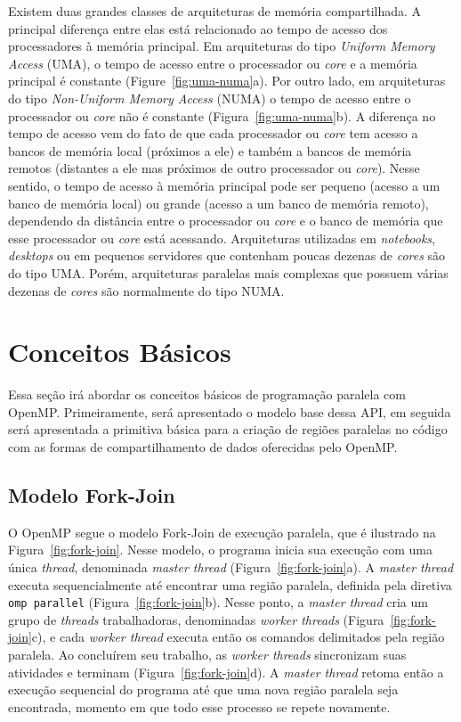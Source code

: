 \documentclass{SBCbookchapter}
\begin{document}
	Existem duas grandes classes de arquiteturas de memória compartilhada. A
	principal diferença entre elas está relacionado ao tempo de acesso dos
	processadores à memória principal. Em arquiteturas do tipo
	\textit{Uniform Memory Access} (UMA), o tempo de acesso entre o
	processador ou \textit{core} e a memória principal é constante (Figure~\ref{fig:uma-numa}a).
	Por outro lado, em arquiteturas do tipo \textit{Non-Uniform Memory Access}
	(NUMA) o tempo de acesso entre o processador ou \textit{core} não é
	constante (Figura~\ref{fig:uma-numa}b). A diferença no tempo de acesso vem
	do fato de que cada processador ou \textit{core} tem acesso a bancos de memória local
	(próximos a ele) e também a bancos de memória remotos (distantes a ele
	mas próximos de outro processador ou \textit{core}). Nesse sentido, o
	tempo de acesso à memória principal pode ser pequeno (acesso a um banco
	de memória local) ou grande (acesso a um banco de memória remoto),
	dependendo da distância entre o processador ou \textit{core} e o banco
	de memória que esse processador ou \textit{core} está acessando.
	Arquiteturas utilizadas em \textit{notebooks}, \textit{desktops} ou em
	pequenos servidores que contenham poucas dezenas de \textit{cores} são
	do tipo UMA. Porém, arquiteturas paralelas mais complexas que possuem
	várias dezenas de \textit{cores} são normalmente do tipo NUMA.

\section{Conceitos Básicos}

	Essa seção irá abordar os conceitos básicos de programação paralela com
	OpenMP. Primeiramente, será apresentado o modelo base dessa API, em
	seguida será apresentada a primitiva básica para a criação de regiões
	paralelas no código com as formas de compartilhamento de dados
	oferecidas pelo OpenMP.

	\subsection{Modelo Fork-Join}

		O OpenMP segue o modelo Fork-Join de execução paralela, que é
		ilustrado na Figura~\ref{fig:fork-join}. Nesse modelo, o programa inicia sua
		execução com uma única \textit{thread}, denominada \textit{master thread}
		(Figura~\ref{fig:fork-join}a). A \textit{master thread} executa sequencialmente até
		encontrar uma região paralela, definida pela diretiva \texttt{omp parallel}
		(Figura~\ref{fig:fork-join}b). Nesse ponto, a \textit{master thread} cria um grupo
		de \textit{threads} trabalhadoras, denominadas \textit{worker threads}
		(Figura~\ref{fig:fork-join}c), e cada \textit{worker thread} executa então os
		comandos delimitados pela região paralela. Ao concluírem seu
		trabalho, as \textit{worker threads} sincronizam suas atividades e
		terminam (Figura~\ref{fig:fork-join}d). A \textit{master thread} retoma então a
		execução sequencial do programa até que uma nova região paralela
		seja encontrada, momento em que todo esse processo se repete
		novamente.
		
\end{document}
